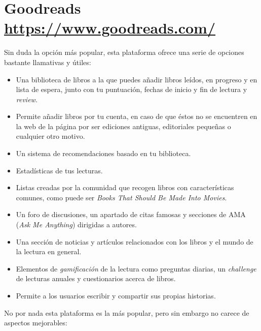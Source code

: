\section[Goodreads]{Goodreads\\ {\large \url{https://www.goodreads.com/}}}

Sin duda la opción más popular, esta plataforma ofrece una serie de opciones bastante llamativas y útiles:

\begin{itemize}
    \item Una biblioteca de libros a la que puedes añadir libros leídos, en progreso y en lista de espera, junto con tu puntuación, fechas de inicio y fin de lectura y \textit{review}.
    \item Permite añadir libros por tu cuenta, en caso de que éstos no se encuentren en la web de la página por ser ediciones antiguas, editoriales pequeñas o cualquier otro motivo.
    \item Un sistema de recomendaciones basado en tu biblioteca.
    \item Estadísticas de tus lecturas.
    \item Listas creadas por la comunidad que recogen libros con características comunes, como puede ser \textit{Books That Should Be Made Into Movies}.
    \item Un foro de discusiones, un apartado de citas famosas y secciones de AMA (\textit{Ask Me Anything}) dirigidas a autores.
    \item Una sección de noticias y artículos relacionados con los libros y el mundo de la lectura en general.
    \item Elementos de \textit{gamificación} de la lectura como preguntas diarias, un \textit{challenge} de lecturas anuales y cuestionarios acerca de libros.
    \item Permite a los usuarios escribir y compartir sus propias historias.
\end{itemize}

No por nada esta plataforma es la más popular, pero sin embargo no carece de aspectos mejorables:

